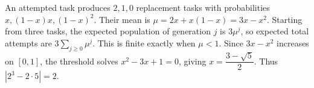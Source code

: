 An attempted task produces $2,1,0$ replacement tasks with probabilities $x,(1-x)x,(1-x)^2$. Their mean is $\mu=2x+x(1-x)=3x-x^2$. Starting from three tasks, the expected population of generation $j$ is $3\mu^j$, so expected total attempts are $3\sum_{j\ge0}\mu^j$. This is finite exactly when $\mu<1$. Since $3x-x^2$ increases on $[0,1]$, the threshold solves $x^2-3x+1=0$, giving $\boxed{x=\dfrac{3-\sqrt5}{2}}$. Thus $|2^3-2\cdot5|=\boxed2$.
